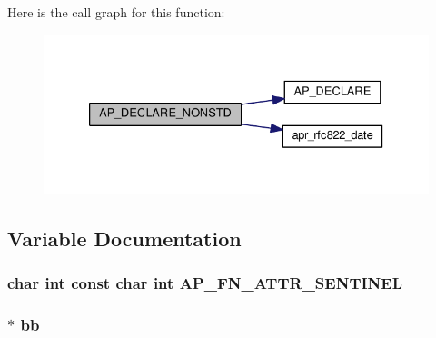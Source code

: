 Here is the call graph for this function\+:
\nopagebreak
\begin{figure}[H]
\begin{center}
\leavevmode
\includegraphics[width=333pt]{group__APACHE__CORE__SCRIPT_ga4d021ea91f99278b88e145101bfcd9ae_cgraph}
\end{center}
\end{figure}




\subsection{Variable Documentation}
\subsubsection[{\texorpdfstring{A\+P\+\_\+\+F\+N\+\_\+\+A\+T\+T\+R\+\_\+\+S\+E\+N\+T\+I\+N\+EL}{AP_FN_ATTR_SENTINEL}}]{\setlength{\rightskip}{0pt plus 5cm}char {\bf int} const char {\bf int} A\+P\+\_\+\+F\+N\+\_\+\+A\+T\+T\+R\+\_\+\+S\+E\+N\+T\+I\+N\+EL}\hypertarget{group__APACHE__CORE__SCRIPT_ga2862bb7a008daea7f74384d50f69ef68}{}\label{group__APACHE__CORE__SCRIPT_ga2862bb7a008daea7f74384d50f69ef68}
\subsubsection[{\texorpdfstring{bb}{bb}}]{$\ast$ bb}\hypertarget{group__APACHE__CORE__SCRIPT_ga0b0eadb381dbe958da483f3d9fc9521a}{}\label{group__APACHE__CORE__SCRIPT_ga0b0eadb381dbe958da483f3d9fc9521a}
